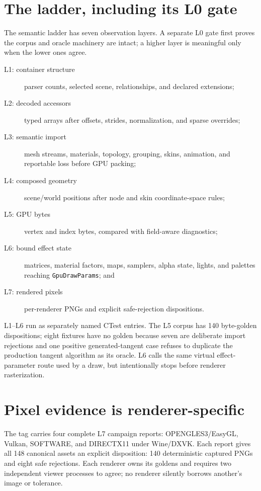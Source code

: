 \section{The ladder, including its L0 gate}

The semantic ladder has seven observation layers. A separate L0 gate first proves the corpus and
oracle machinery are intact; a higher layer is meaningful only when the lower ones agree.

\begin{description}
  \item[L1: container structure] parser counts, selected scene, relationships, and declared
        extensions;
  \item[L2: decoded accessors] typed arrays after offsets, strides, normalization, and sparse
        overrides;
  \item[L3: semantic import] mesh streams, materials, topology, grouping, skins, animation, and
        reportable loss before GPU packing;
  \item[L4: composed geometry] scene/world positions after node and skin coordinate-space rules;
  \item[L5: GPU bytes] vertex and index bytes, compared with field-aware diagnostics;
  \item[L6: bound effect state] matrices, material factors, maps, samplers, alpha state, lights,
        and palettes reaching \texttt{GpuDrawParams}; and
  \item[L7: rendered pixels] per-renderer PNGs and explicit safe-rejection dispositions.
\end{description}

L1--L6 run as separately named CTest entries. The L5 corpus has 140 byte-golden dispositions;
eight fixtures have no golden because seven are deliberate import rejections and one positive
generated-tangent case refuses to duplicate the production tangent algorithm as its oracle.
L6 calls the same virtual effect-parameter route used by a draw, but intentionally stops before
renderer rasterization.

\section{Pixel evidence is renderer-specific}

The tag carries four complete L7 campaign reports: OPENGLES3/EasyGL, Vulkan, SOFTWARE, and
DIRECTX11 under Wine/DXVK. Each report gives all 148 canonical assets an explicit disposition:
140 deterministic captured PNGs and eight safe rejections. Each renderer owns its goldens and
requires two independent viewer processes to agree; no renderer silently borrows another's image
or tolerance.

